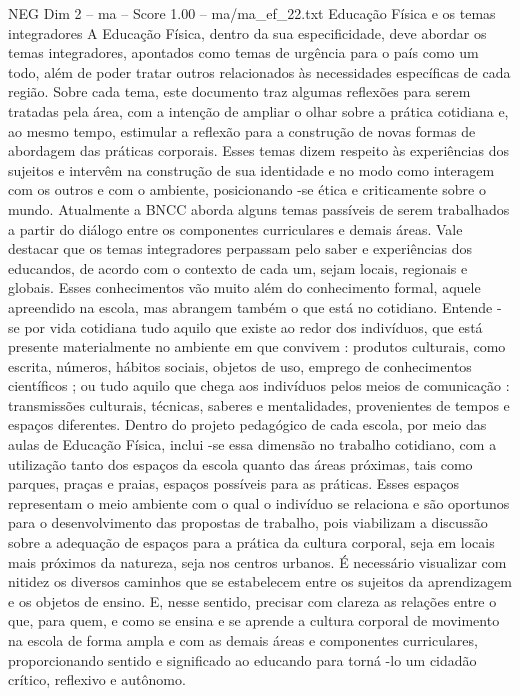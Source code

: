 \begin{textsample}{NEG Dim 2 – ma – Score 1.00 – ma/ma\_ef\_22.txt}  \label{ex:f2_neg_237}
Educação Física e os temas integradores A Educação Física, dentro da sua especificidade, deve abordar os temas integradores, apontados como temas de urgência para o país como um todo, além de poder tratar outros relacionados às necessidades específicas de cada região.
Sobre cada tema, este documento traz algumas reflexões para serem tratadas pela área, com a intenção de ampliar o olhar sobre a prática cotidiana e, ao mesmo tempo, estimular a reflexão para a construção de novas formas de abordagem das práticas corporais.
Esses temas dizem respeito às experiências dos sujeitos e intervêm na construção de sua identidade e no modo como interagem com os outros e com o ambiente, posicionando -se ética e criticamente sobre o mundo.
Atualmente a BNCC aborda alguns temas passíveis de serem trabalhados a partir do diálogo entre os componentes curriculares e demais áreas.
Vale destacar que os temas integradores perpassam pelo saber e experiências dos educandos, de acordo com o contexto de cada um, sejam locais, regionais e globais.
Esses conhecimentos vão muito além do conhecimento formal, aquele apreendido na escola, mas abrangem também o que está no cotidiano.
Entende -se por vida cotidiana tudo aquilo que existe ao redor dos indivíduos, que está presente materialmente no ambiente em que convivem : produtos culturais, como escrita, números, hábitos sociais, objetos de uso, emprego de conhecimentos científicos ; ou tudo aquilo que chega aos indivíduos pelos meios de comunicação : transmissões culturais, técnicas, saberes e mentalidades, provenientes de tempos e espaços diferentes.
Dentro do projeto pedagógico de cada escola, por meio das aulas de Educação Física, inclui -se essa dimensão no trabalho cotidiano, com a utilização tanto dos espaços da escola quanto das áreas próximas, tais como parques, praças e praias, espaços possíveis para as práticas.
Esses espaços representam o meio ambiente com o qual o indivíduo se relaciona e são oportunos para o desenvolvimento das propostas de trabalho, pois viabilizam a discussão sobre a adequação de espaços para a prática da cultura corporal, seja em locais mais próximos da natureza, seja nos centros urbanos.
É necessário visualizar com nitidez os diversos caminhos que se estabelecem entre os sujeitos da aprendizagem e os objetos de ensino.
E, nesse sentido, precisar com clareza as relações entre o que, para quem, e como se ensina e se aprende a cultura corporal de movimento na escola de forma ampla e com as demais áreas e componentes curriculares, proporcionando sentido e significado ao educando para torná -lo um cidadão crítico, reflexivo e autônomo.

\end{textsample}
